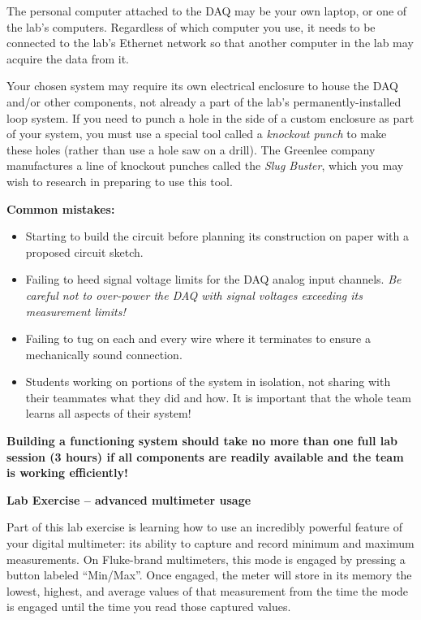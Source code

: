 \vskip 10pt

The personal computer attached to the DAQ may be your own laptop, or one of the lab's computers.  Regardless of which computer you use, it needs to be connected to the lab's Ethernet network so that another computer in the lab may acquire the data from it.

\vskip 10pt

Your chosen system may require its own electrical enclosure to house the DAQ and/or other components, not already a part of the lab's permanently-installed loop system.  If you need to punch a hole in the side of a custom enclosure as part of your system, you must use a special tool called a {\it knockout punch} to make these holes (rather than use a hole saw on a drill).  The Greenlee company manufactures a line of knockout punches called the {\it Slug Buster}, which you may wish to research in preparing to use this tool.

\vskip 10pt

{\bf Common mistakes:}

\begin{itemize}
\item{} Starting to build the circuit before planning its construction on paper with a proposed circuit sketch.
\item{} Failing to heed signal voltage limits for the DAQ analog input channels.  {\it Be careful not to over-power the DAQ with signal voltages exceeding its measurement limits!}
\item{} Failing to tug on each and every wire where it terminates to ensure a mechanically sound connection.
\item{} Students working on portions of the system in isolation, not sharing with their teammates what they did and how.  It is important that the whole team learns all aspects of their system!
\end{itemize}

\vskip 10pt

{\bf Building a functioning system should take no more than one full lab session (3 hours) if all components are readily available and the team is working efficiently!}







\vfil \eject

\noindent
{\bf Lab Exercise -- advanced multimeter usage}

\vskip 5pt

Part of this lab exercise is learning how to use an incredibly powerful feature of your digital multimeter: its ability to capture and record minimum and maximum measurements.  On Fluke-brand multimeters, this mode is engaged by pressing a button labeled ``Min/Max''.  Once engaged, the meter will store in its memory the lowest, highest, and average values of that measurement from the time the mode is engaged until the time you read those captured values.

